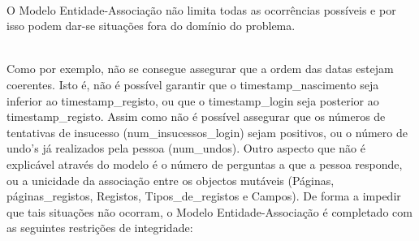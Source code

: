 \documentclass[11pt,a4paper]{article}
\begin{document}
\paragraph{}

O Modelo Entidade-Associação não limita todas as ocorrências possíveis e por isso podem dar-se situações fora do domínio do problema.

\\Como por exemplo, não se consegue assegurar que a ordem das datas estejam coerentes. Isto é, não é possível garantir que o timestamp\_nascimento seja inferior ao timestamp\_registo, ou que o timestamp\_login seja posterior ao timestamp\_registo.
Assim como não é possível assegurar que os números de tentativas de insucesso (num\_insucessos\_login) sejam positivos, ou o número de undo’s já realizados pela pessoa (num\_undos).
Outro aspecto que não é explicável através do modelo é o número de perguntas a que a pessoa responde, ou a unicidade da associação entre os objectos mutáveis (Páginas, páginas\_registos, Registos, Tipos\_de\_registos e Campos).
De forma a impedir que tais situações não ocorram, o Modelo Entidade-Associação é completado com as seguintes restrições de integridade:
\\
\end{document}
